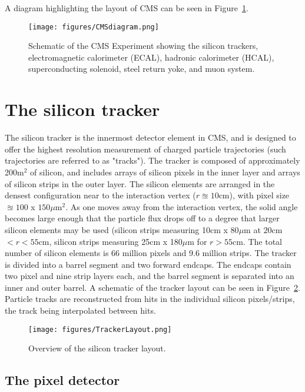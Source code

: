A diagram highlighting the layout of CMS can be seen in Figure~\ref{fig:CMSdiagram}.

\begin{figure}\centering
  \texttt{[image: figures/CMSdiagram.png]}
  \caption{\label{fig:CMSdiagram} Schematic of the CMS Experiment showing the silicon trackers, electromagnetic calorimeter (ECAL), hadronic calorimeter (HCAL), superconducting solenoid, steel return yoke, and muon system.}
\end{figure}

\section{The silicon tracker}

The silicon tracker is the innermost detector element in CMS, and is designed to offer the highest resolution measurement of charged particle trajectories (such trajectories are referred to as "tracks"). The tracker is composed of approximately 200m$^2$ of silicon, and includes arrays of silicon pixels in the inner layer and arrays of silicon strips in the outer layer. The silicon elements are arranged in the densest configuration near to the interaction vertex ($ r\approxeq 10$cm), with pixel size $\approxeq 100$ x $150 \mu$m$^2$. As one moves away from the interaction vertex, the solid angle becomes large enough that the particle flux drops off to a degree that larger silicon elements may be used (silicon strips measuring 10cm x 80$\mu$m at $20$cm$ \lt r \lt 55$cm, silicon strips measuring 25cm x 180$\mu$m for $r \gt 55$cm. The total number of silicon elements is 66 million pixels and 9.6 million strips. The tracker is divided into a barrel segment and two forward endcaps. The endcaps contain two pixel and nine strip layers each, and the barrel segment is separated into an inner and outer barrel. A schematic of the tracker layout can be seen in Figure~\ref{fig:TrackerLayout}. Particle tracks are reconstructed from hits in the individual silicon pixels/strips, the track being interpolated between hits.

\begin{figure}\centering
  \texttt{[image: figures/TrackerLayout.png]}
  \caption{\label{fig:TrackerLayout} Overview of the silicon tracker layout.}
\end{figure}


\subsection{The pixel detector}

